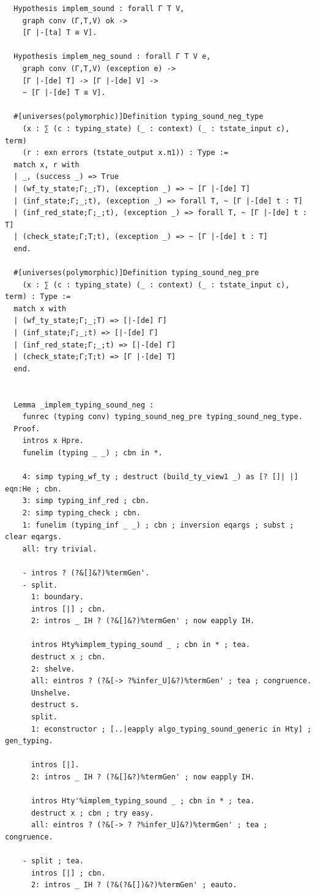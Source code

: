 \documentclass[10pt,a4paper]{amsart}
\begin{document}
\begin{lstlisting}
  Hypothesis implem_sound : forall Γ T V,
    graph conv (Γ,T,V) ok ->
    [Γ |-[ta] T ≅ V].

  Hypothesis implem_neg_sound : forall Γ T V e,
    graph conv (Γ,T,V) (exception e) ->
    [Γ |-[de] T] -> [Γ |-[de] V] ->
    ~ [Γ |-[de] T ≅ V].

  #[universes(polymorphic)]Definition typing_sound_neg_type
    (x : ∑ (c : typing_state) (_ : context) (_ : tstate_input c), term)
    (r : exn errors (tstate_output x.π1)) : Type :=
  match x, r with
  | _, (success _) => True
  | (wf_ty_state;Γ;_;T), (exception _) => ~ [Γ |-[de] T]
  | (inf_state;Γ;_;t), (exception _) => forall T, ~ [Γ |-[de] t : T]
  | (inf_red_state;Γ;_;t), (exception _) => forall T, ~ [Γ |-[de] t : T]
  | (check_state;Γ;T;t), (exception _) => ~ [Γ |-[de] t : T]
  end.

  #[universes(polymorphic)]Definition typing_sound_neg_pre
    (x : ∑ (c : typing_state) (_ : context) (_ : tstate_input c), term) : Type :=
  match x with
  | (wf_ty_state;Γ;_;T) => [|-[de] Γ]
  | (inf_state;Γ;_;t) => [|-[de] Γ]
  | (inf_red_state;Γ;_;t) => [|-[de] Γ]
  | (check_state;Γ;T;t) => [Γ |-[de] T]
  end.


  Lemma _implem_typing_sound_neg :
    funrec (typing conv) typing_sound_neg_pre typing_sound_neg_type.
  Proof.
    intros x Hpre.
    funelim (typing _ _) ; cbn in *.

    4: simp typing_wf_ty ; destruct (build_ty_view1 _) as [? []| |] eqn:He ; cbn.
    3: simp typing_inf_red ; cbn.
    2: simp typing_check ; cbn.
    1: funelim (typing_inf _ _) ; cbn ; inversion eqargs ; subst ; clear eqargs.
    all: try trivial.

    - intros ? (?&[]&?)%termGen'.
    - split.
      1: boundary.
      intros [|] ; cbn.
      2: intros _ IH ? (?&[]&?)%termGen' ; now eapply IH.
      
      intros Hty%implem_typing_sound _ ; cbn in * ; tea.
      destruct x ; cbn.
      2: shelve.
      all: eintros ? (?&[-> ?%infer_U]&?)%termGen' ; tea ; congruence.
      Unshelve.
      destruct s.
      split.
      1: econstructor ; [..|eapply algo_typing_sound_generic in Hty] ; gen_typing.

      intros [|].
      2: intros _ IH ? (?&[]&?)%termGen' ; now eapply IH.

      intros Hty'%implem_typing_sound _ ; cbn in * ; tea.
      destruct x ; cbn ; try easy.
      all: eintros ? (?&[-> ? ?%infer_U]&?)%termGen' ; tea ; congruence.

    - split ; tea.
      intros [|] ; cbn.
      2: intros _ IH ? (?&(?&[])&?)%termGen' ; eauto.


\end{lstlisting}
\end{document}
